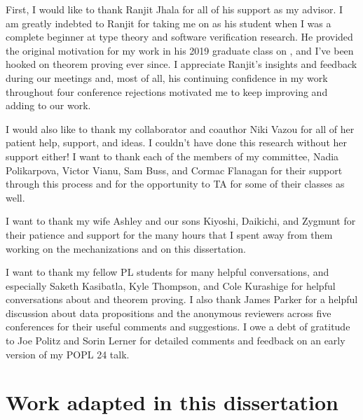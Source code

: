 \begin{frontmatter}
%
%
\begin{acknowledgements}
    First, I would like to thank Ranjit Jhala for all of his support as
    my advisor. 
    I am greatly indebted to Ranjit for taking me on as his student when I 
    was a complete beginner at type theory and software verification
    research.
    He provided the original motivation for my work in his 2019 
    graduate class on \lh, and I've been hooked on theorem proving ever since.
    I appreciate Ranjit's insights and feedback during our 
    meetings and, most of all, his continuing confidence in my work 
    throughout four conference rejections motivated me to keep improving 
    and adding to our work.

    I would also like to thank my collaborator and coauthor Niki Vazou
    for all of her patient help, support, and ideas. I couldn't have 
    done this research without her support either!
    I want to thank each of the members of my committee, Nadia Polikarpova,
    Victor Vianu, Sam Buss, and Cormac Flanagan for their support through 
    this process and for the opportunity to TA
    for some of their classes as well.

    I want to thank my wife Ashley and our sons Kiyoshi, Daikichi,
    and Zygmunt for their patience and support for the many hours that
    I spent 
    away from them working on the mechanizations and on this dissertation.

    I want to thank my fellow PL students for many helpful conversations, 
    and especially Saketh Kasibatla, Kyle Thompson, and Cole Kurashige
    for helpful conversations about \coq and theorem proving.
    I also thank James Parker for a helpful discussion 
    about data propositions and the anonymous reviewers across five 
    conferences for their useful comments and suggestions. 
    I owe a debt of gratitude to Joe Politz and Sorin Lerner for detailed
    comments and feedback on an early version of my POPL 24 talk.

    \section*{Work adapted in this dissertation}


\end{acknowledgements}
\end{frontmatter}
